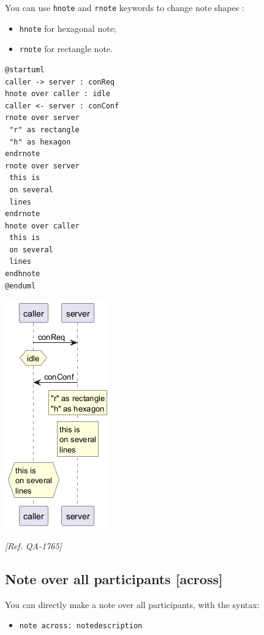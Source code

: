 You can use \texttt{hnote} and \texttt{rnote} keywords
to change note shapes :
\begin{itemize}
\item \texttt{hnote} for hexagonal note;
\item \texttt{rnote} for rectangle note.
\end{itemize}
\begin{verbatim}
@startuml
caller -> server : conReq
hnote over caller : idle
caller <- server : conConf
rnote over server
 "r" as rectangle
 "h" as hexagon
endrnote
rnote over server
 this is
 on several
 lines
endrnote
hnote over caller
 this is
 on several
 lines
endhnote
@enduml
\end{verbatim}
\begin{center}
\includegraphics[scale=0.60]{imgw/img-7833125523a0fcee5620f6712c551617.png}
\end{center}


\textit{[Ref. QA-1765]}
%
%
\subsection{Note over all participants [across]}


You can directly make a note over all participants, with the syntax:
\begin{itemize}
\item \texttt{note across: note\textunderscore description}
\end{itemize}


